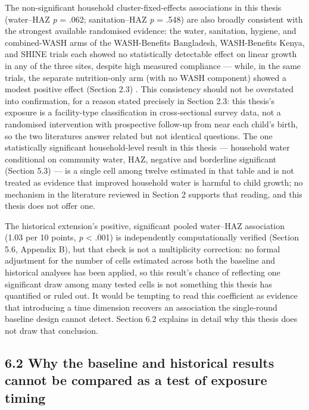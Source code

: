 The non-significant household cluster-fixed-effects associations in this thesis (water--HAZ \textit{p} = .062; sanitation--HAZ \textit{p} = .548) are also broadly consistent with the strongest available randomised evidence: the water, sanitation, hygiene, and combined-WASH arms of the WASH-Benefits Bangladesh, WASH-Benefits Kenya, and SHINE trials each showed no statistically detectable effect on linear growth in any of the three sites, despite high measured compliance --- while, in the same trials, the separate nutrition-only arm (with no WASH component) showed a modest positive effect (Section 2.3) \parencite{Cumming2019}. This consistency should not be overstated into confirmation, for a reason stated precisely in Section 2.3: this thesis's exposure is a facility-type classification in cross-sectional survey data, not a randomised intervention with prospective follow-up from near each child's birth, so the two literatures answer related but not identical questions. The one statistically significant household-level result in this thesis --- household water conditional on community water, HAZ, negative and borderline significant (Section 5.3) --- is a single cell among twelve estimated in that table and is not treated as evidence that improved household water is harmful to child growth; no mechanism in the literature reviewed in Section 2 supports that reading, and this thesis does not offer one.

The historical extension's positive, significant pooled water--HAZ association (1.03 per 10 points, \textit{p} < .001) is independently computationally verified (Section 5.6, Appendix B), but that check is not a multiplicity correction: no formal adjustment for the number of cells estimated across both the baseline and historical analyses has been applied, so this result's chance of reflecting one significant draw among many tested cells is not something this thesis has quantified or ruled out. It would be tempting to read this coefficient as evidence that introducing a time dimension recovers an association the single-round baseline design cannot detect. Section 6.2 explains in detail why this thesis does not draw that conclusion.

\subsection*{6.2 Why the baseline and historical results cannot be compared as a test of exposure timing}

